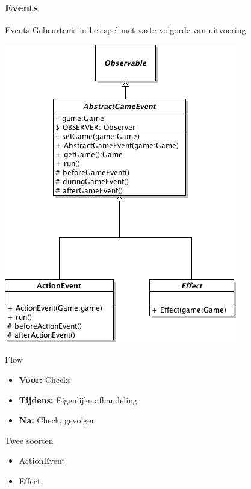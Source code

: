 \documentclass[t]{beamer}
\begin{document}
\subsubsection{Events}

\begin{frame}{Events}
Gebeurtenis in het spel met vaste volgorde van uitvoering

\begin{multicols}{2}
\begin{center}
\includegraphics[width=0.60\linewidth]{images/GameEvent}
\end{center}
Flow
\begin{itemize}
	\item \textbf{Voor:} Checks
	\item \textbf{Tijdens:} Eigenlijke afhandeling
	\item \textbf{Na:} Check, gevolgen
\end{itemize}
Twee soorten
\begin{itemize}
	\item ActionEvent
	\item Effect
\end{itemize}
\end{multicols}

\end{frame}
\end{document}
